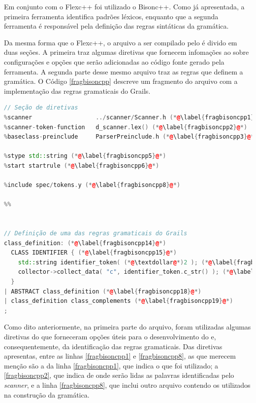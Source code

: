 Em conjunto com o \textsf{Flexc++} foi utilizado o \textsf{Bisonc++}. Como já
apresentada, a primeira ferramenta identifica padrões léxicos, enquanto que a
segunda ferramenta é responsável pela definição das regras sintáticas da
gramática.

Da mesma forma que o \textsf{Flexc++}, o arquivo a ser compilado pelo \bisoncpp é divido
em duas seções. A primeira traz algumas diretivas que fornecem infomações ao
\bisoncpp sobre configurações e opções que serão adicionadas ao código fonte
gerado pela ferramenta. A segunda parte desse mesmo arquivo traz as regras
que definem a gramática. O Código \ref{fragbisoncpp} descreve um fragmento
do arquivo com a implementação das regras gramaticais do \textsf{Grails}.

\begin{lstlisting}[language=C++, label=fragbisoncpp, caption=Fragmento do código fonte para o \bisoncpp]
// Seção de diretivas
%scanner                  ../scanner/Scanner.h (*@\label{fragbisoncpp1}@*)
%scanner-token-function   d_scanner.lex() (*@\label{fragbisoncpp2}@*)
%baseclass-preinclude     ParserPreinclude.h (*@\label{fragbisoncpp3}@*)

%stype std::string (*@\label{fragbisoncpp5}@*)
%start startrule (*@\label{fragbisoncpp6}@*)

%include spec/tokens.y (*@\label{fragbisoncpp8}@*)

%%


// Definição de uma das regras gramaticais do Grails
class_definition: (*@\label{fragbisoncpp14}@*)
  CLASS IDENTIFIER { (*@\label{fragbisoncpp15}@*)
    std::string identifier_token( (*@\textdollar@*)2 ); (*@\label{fragbisoncpp16}@*)
    collector->collect_data( "c", identifier_token.c_str() ); (*@\label{fragbisoncpp17}@*)
  }
| ABSTRACT class_definition (*@\label{fragbisoncpp18}@*)
| class_definition class_complements (*@\label{fragbisoncpp19}@*)
;
\end{lstlisting}

Como dito anteriormente, na primeira parte do arquivo, foram utilizadas algumas
diretivas do \bisoncpp que forneceram opções úteis para o desenvolvimento do
\parser e, consequentemente, da identificação das regras gramaticais. Das
diretivas apresentas, entre as linhas \ref{fragbisoncpp1} e
\ref{fragbisoncpp8}, as que merecem menção são a da linha
\ref{fragbisoncpp1}, que indica o \scanner que foi utilizado;
a \ref{fragbisoncpp2}, que indica de onde serão lidas as palavras identificadas
pelo \textit{scanner}, e a linha \ref{fragbisoncpp8}, que inclui outro
arquivo contendo os \tokens utilizados na construção da gramática.

